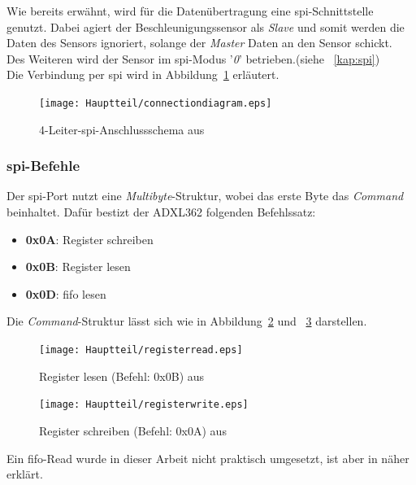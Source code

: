 Wie bereits erwähnt, wird für die Datenübertragung eine \ac{spi}-Schnittstelle genutzt. Dabei agiert der
Beschleunigungssensor als \emph{Slave} und somit werden die Daten des Sensors ignoriert, solange der \emph{Master}
Daten an den Sensor schickt.\\
 Des Weiteren wird der Sensor im \ac{spi}-Modus '\emph{0}' betrieben.(siehe ~\ref{kap:spi})\\
Die Verbindung per \ac{spi} wird in Abbildung~\ref{fig:connectiondiagram} erläutert.\\

\begin{figure}[h!]
\centering
\texttt{[image: Hauptteil/connectiondiagram.eps]}
\caption{4-Leiter-\ac{spi}-Anschlussschema aus \cite{accelerometer} }
\label{fig:connectiondiagram}
\end{figure}

\subsubsection{\ac{spi}-Befehle}

Der \ac{spi}-Port nutzt eine \emph{Multibyte}-Struktur, wobei das erste Byte das \emph{Command} beinhaltet.
Dafür bestizt der ADXL362 folgenden Befehlssatz:\cite{accelerometer}\\
\begin{itemize}
  \item \textbf{0x0A}: Register schreiben
  \item \textbf{0x0B}: Register lesen
  \item \textbf{0x0D}: \ac{fifo} lesen
\end{itemize}

Die \emph{Command}-Struktur lässt sich wie in Abbildung~\ref{fig:registerread} und ~\ref{fig:registerwrite} darstellen.\\

\begin{figure}[h!]
\centering
\texttt{[image: Hauptteil/registerread.eps]}
\caption{Register lesen (Befehl: 0x0B) aus \cite{accelerometer} }
\label{fig:registerread}
\end{figure}

\begin{figure}[h!]
\centering
\texttt{[image: Hauptteil/registerwrite.eps]}
\caption{Register schreiben (Befehl: 0x0A) aus \cite{accelerometer} }
\label{fig:registerwrite}
\end{figure}

Ein \ac{fifo}-Read wurde in dieser Arbeit nicht praktisch umgesetzt, ist aber in \cite{accelerometer} näher erklärt.\\


